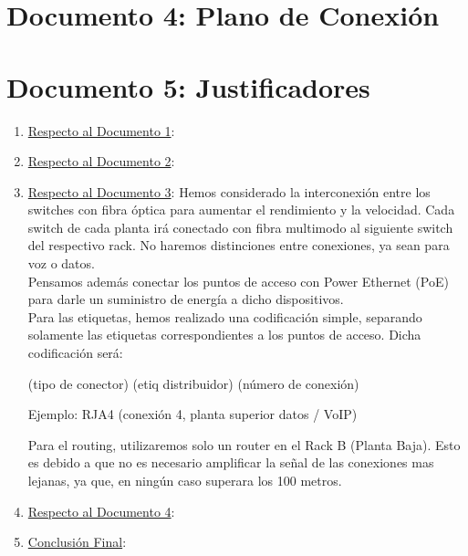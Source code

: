 \documentclass[]{article}
\begin{document}
\newpage

\section{Documento 4: Plano de Conexión}

\newpage

\section{Documento 5: Justificadores}

\begin{enumerate}[label=\alph*]
   \item \underline{Respecto al Documento 1}:
   \item \underline{Respecto al Documento 2}:
   \item \underline{Respecto al Documento 3}:
        Hemos considerado la interconexión entre los switches con fibra óptica para aumentar el rendimiento y la velocidad. Cada switch de cada planta irá conectado con fibra multimodo al siguiente switch del respectivo rack. No haremos distinciones entre conexiones, ya sean para voz o datos. \\
        Pensamos además conectar los puntos de acceso con Power Ethernet (PoE) para darle un suministro de energía a dicho dispositivos. \\
        Para las etiquetas, hemos realizado una codificación simple, separando solamente las etiquetas correspondientes a los puntos de acceso. Dicha codificación será:
        \begin{center} (tipo de conector) (etiq distribuidor) (número de conexión)\end{center}
        \begin{center}Ejemplo: RJA4 (conexión 4, planta superior datos / VoIP)\end{center}
        Para el routing, utilizaremos solo un router en el Rack B (Planta Baja). Esto es debido a que no es necesario amplificar la señal de las conexiones mas lejanas, ya que, en ningún caso superara los 100 metros.
   \item \underline{Respecto al Documento 4}:
   \item \underline{Conclusión Final}:
\end{enumerate}




% 
\end{document}
